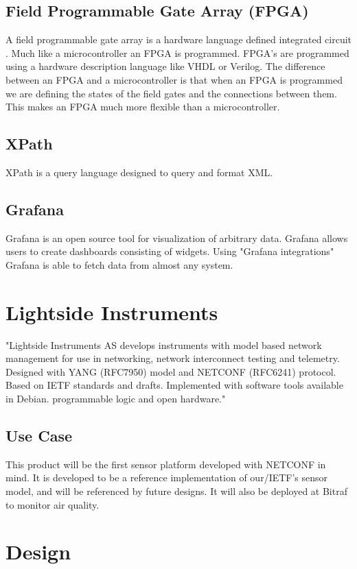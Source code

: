 \documentclass[12pt]{article}
\begin{document}
\subsection{Field Programmable Gate Array (FPGA)}
A field programmable gate array is a hardware language defined integrated circuit \cite{FieldprogrammableGateArray2025}. 
Much like a microcontroller an FPGA is programmed. FPGA's are programmed using a hardware description language like VHDL or Verilog.
The difference between an FPGA and a microcontroller is that when an FPGA is programmed we are defining 
the states of the field gates and the connections between them. This makes an FPGA much more flexible than a microcontroller.

\subsection{XPath}
XPath is a query language designed to query and format XML. \cite{XPathMDN2024}

\subsection{Grafana}
Grafana is an open source tool for visualization of arbitrary data. Grafana allows users to create
dashboards consisting of widgets. Using "Grafana integrations" Grafana is able to fetch data from almost any 
system. \cite{GrafanaOpenComposable}

\section{Lightside Instruments}
"Lightside Instruments AS develops instruments with model based network management for use in networking, 
network interconnect testing and telemetry. Designed with YANG (RFC7950) model and NETCONF (RFC6241) protocol. 
Based on IETF standards and drafts. Implemented with software tools available in Debian. programmable logic and open hardware." \cite{LightsideInstrumentsYANG}

\subsection{Use Case}
This product will be the first sensor platform developed with NETCONF in mind. 
It is developed to be a reference implementation of our/IETF's sensor model, and will
be referenced by future designs. It will also be deployed at Bitraf to monitor air quality.

\section{Design}
\end{document}

